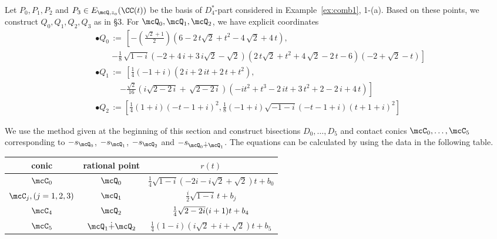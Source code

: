 \begin{exmple}[{\bf Combinatorics  3-(a)}] \label{ex:combi-3a}\rm

Let $P_0, P_1, P_2$ and $P_3 \in E_{\mcQ, z_o}(\CC(t))$ be the basis of $D^*_4$-part considered in Example~\ref{ex:comb1}, 1-(a).
Based on these points, we construct $Q_0, Q_1, Q_2, Q_3$ as in \S 3.  For $\mcQ_0, \mcQ_1, \mcQ_2$, we have explicit coordinates
\begin{align*}
&\bullet \displaystyle Q_{{0}}\, := \, \left[  - \left( \frac{\sqrt {2}+1}2 \right)  \left( 6-2\,t\sqrt {2}+{t}^{2}-4\,\sqrt {2}+4\,t \right)\right. , \\
 &\quad\quad\left.-\frac{1}{8}\,\sqrt {1-i} \left( -2+4\,i+3\,i\sqrt {2}-\sqrt {2} \right) 
 \left( 2\,t\sqrt {2}+{t}^{2}+4\,\sqrt {2}-2\,t-6 \right)  \left( -2+
\sqrt {2}-t \right) 
\right] \\
&\bullet \displaystyle Q_{{1}}\, := \, \left[  \frac{1}{4}(-1+i)\left( 2\,i+2\,it+2\,t+{t}^{2} \right) \right. ,\\
&\quad\quad\quad\left. - \frac{\sqrt{2}}{16}\left( i\sqrt {2-2\,i}+\,\sqrt {2-2\,i} \right)  \left( -i{t}^{2}+{t}^{3}-2\,it+3\,{t}^{2}+2-2\,i+4\,t \right) \right] \\
&\bullet \displaystyle Q_{{2}}\,:=\left[ \frac{1}{4}\left( 1+i\right)  \left( -t-1+i \right) ^{2}\right.,\left. \frac{1}{8}\left( -1+i\right) \sqrt {-1-i} \left( -t-1+i \right)  \left( t+1+i \right) ^{2} \right]
\end{align*}

We use the method given at the beginning of this section and construct bisections $D_0, \ldots, D_5$ and contact conics $\mcC_0, \ldots, \mcC_5$ corresponding to $-s_{\mcQ_0}$, $-s_{\mcQ_1}$, $-s_{\mcQ_2}$  and $-s_{\mcQ_0\dot+\mcQ_1}$. 
The equations  can be calculated by using the data in the following table. 
\begin{center}
\begin{tabular}{c|c|c}
conic & rational point & $r(t)$\\
\hline
$\mcC_0$ & $\mcQ_0$ & $\frac{1}{4}\sqrt{1-i}\left(-2i-i\sqrt{2}+\sqrt{2}\right) t+b_0$\\
$\mcC_j, (j=1,2,3)$ & $\mcQ_1$ &  $\frac{i}{2}\sqrt {1-i}\,t+b_j$\\
$\mcC_4$ & $\mcQ_2$ & $\-\frac{1}{4}\sqrt{2-2i}(i+1)t+b_4$ \\
$\mcC_5$ & $\mcQ_1\dot+\mcQ_2$ & $\frac{1}{4}(1-i)\left(i\sqrt {2}+i+\sqrt {2}\right) t+b_5$
\end{tabular}
\end{center}


\end{exmple}
